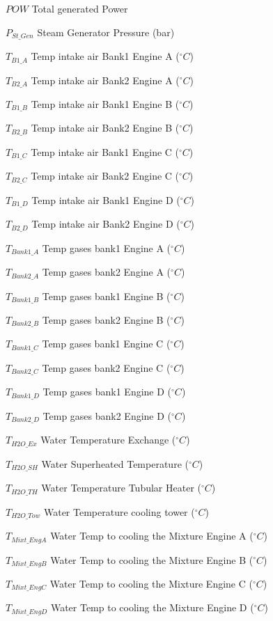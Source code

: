 \documentclass[preprint,12pt,authoryear]{elsarticle}
\begin{document}
\par $POW$		Total generated Power
\par $P_{St\_Gen}$	Steam Generator Pressure (bar)
\par $T_{B1\_A}$	Temp intake air Bank1 Engine A ($^{\circ}C$) 
\par $T_{B2\_A}$	Temp intake air Bank2 Engine A ($^{\circ}C$) 
\par $T_{B1\_B}$	Temp intake air Bank1 Engine B ($^{\circ}C$) 
\par $T_{B2\_B}$	Temp intake air Bank2 Engine B ($^{\circ}C$) 
\par $T_{B1\_C}$	Temp intake air Bank1 Engine C ($^{\circ}C$) 
\par $T_{B2\_C}$	Temp intake air Bank2 Engine C ($^{\circ}C$) 
\par $T_{B1\_D}$	Temp intake air Bank1 Engine D ($^{\circ}C$) 
\par $T_{B2\_D}$	Temp intake air Bank2 Engine D ($^{\circ}C$) 
\par $T_{Bank1\_A}$	Temp gases bank1 Engine A ($^{\circ}C$) 
\par $T_{Bank2\_A}$	Temp gases bank2 Engine A ($^{\circ}C$) 
\par $T_{Bank1\_B}$	Temp gases bank1 Engine B ($^{\circ}C$) 
\par $T_{Bank2\_B}$	Temp gases bank2 Engine B ($^{\circ}C$) 
\par $T_{Bank1\_C}$	Temp gases bank1 Engine C ($^{\circ}C$) 
\par $T_{Bank2\_C}$	Temp gases bank2 Engine C ($^{\circ}C$) 
\par $T_{Bank1\_D}$	Temp gases bank1 Engine D ($^{\circ}C$) 
\par $T_{Bank2\_D}$	Temp gases bank2 Engine D ($^{\circ}C$) 
\par $T_{H2O\_Ex}$	Water Temperature Exchange ($^{\circ}C$) 
\par $T_{H2O\_SH}$	Water Superheated Temperature ($^{\circ}C$) 
\par $T_{H2O\_TH}$	Water Temperature Tubular Heater ($^{\circ}C$) 
\par $T_{H2O\_Tow}$	Water Temperature cooling tower ($^{\circ}C$) 
\par $T_{Mixt\_EngA}$	Water Temp to cooling the Mixture Engine A ($^{\circ}C$) 
\par $T_{Mixt\_EngB}$	Water Temp to cooling the Mixture Engine B ($^{\circ}C$)  
\par $T_{Mixt\_EngC}$	Water Temp to cooling the Mixture Engine C ($^{\circ}C$)  
\par $T_{Mixt\_EngD}$	Water Temp to cooling the Mixture Engine D ($^{\circ}C$)

\FloatBarrier
 



\end{document}
